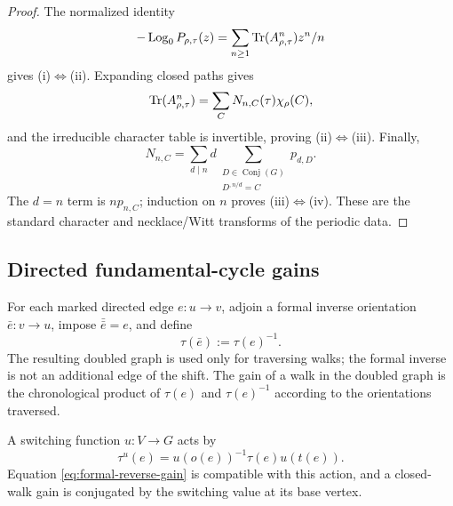 \begin{proof}
The normalized identity
\[
 -\operatorname{Log}_0P_{\rho,\tau}(z)
 =\sum_{n\ge1}\operatorname{Tr}(A_{\rho,\tau}^n)z^n/n
\]
gives (i)\(\Leftrightarrow\)(ii).  Expanding closed paths gives
\[
 \operatorname{Tr}(A_{\rho,\tau}^n)=\sum_C N_{n,C}(\tau)\chi_\rho(C),
\]
and the irreducible character table is invertible, proving
(ii)\(\Leftrightarrow\)(iii).  Finally,
\begin{equation}\label{eq:appendix-periodic-primitive-triangular}
 N_{n,C}=\sum_{d\mid n}d
   \sum_{\substack{D\in\operatorname{Conj}(G)\\D^{,n/d}=C}}p_{d,D}.
\end{equation}
The \(d=n\) term is \(np_{n,C}\); induction on \(n\) proves
(iii)\(\Leftrightarrow\)(iv).  These are the standard character and
necklace/Witt transforms of the periodic data.
\end{proof}

\subsection{Directed fundamental-cycle gains}

For each marked directed edge \(e:u\to v\), adjoin a formal inverse
orientation \(\bar e:v\to u\), impose \(\bar{\bar e}=e\), and define
\begin{equation}\label{eq:formal-reverse-gain}
 \tau(\bar e):=\tau(e)^{-1}.
\end{equation}
The resulting doubled graph is used only for traversing walks; the formal
inverse is not an additional edge of the shift.  The gain of a walk in the
doubled graph is the chronological product of \(\tau(e)\) and
\(\tau(e)^{-1}\) according to the orientations traversed.

A switching function \(u:V\to G\) acts by
\begin{equation}\label{eq:appendix-switching-action}
 \tau^u(e)=u(o(e))^{-1}\tau(e)u(t(e)).
\end{equation}
Equation \eqref{eq:formal-reverse-gain} is compatible with this action, and a
closed-walk gain is conjugated by the switching value at its base vertex.

